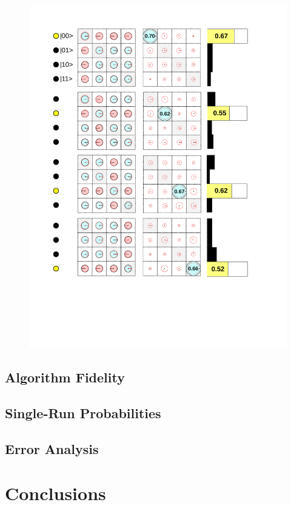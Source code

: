 \begin{figure}
	\centering
		\includegraphics[width=1.\textwidth]{./material/papers/grover/figures/grover_algorithm_experimental_results}
	\label{fig:GroverAlgorithmExperimentalResults}
	\caption{}
\end{figure}

\subsection{Algorithm Fidelity}


\subsection{Single-Run Probabilities}

\subsection{Error Analysis}

\section{Conclusions}

